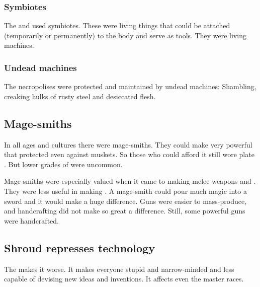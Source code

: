 \subsubsection{Symbiotes}
The \dragons and \ophidians used symbiotes. 
These were living things that could be attached (temporarily or permanently) to the body and serve as tools. 
They were living machines. 





\subsubsection{Undead machines}
The \draconic{} necropolises were protected and maintained by undead machines: 
Shambling, creaking hulks of rusty steel and desiccated flesh. 










\subsection{Mage-smiths}
In all ages and cultures there were mage-smiths. 
They could make very powerful \armour that protected even against muskets.
So those who could afford it still wore plate \armour.
But lower grades of \armour were uncommon.

Mage-smiths were especially valued when it came to making melee weapons and \armour. 
They were less useful in making . 
A mage-smith could pour much magic into a sword and it would make a huge difference.
Guns were easier to mass-produce, and handcrafting did not make so great a difference.
Still, some powerful guns were handcrafted.










\subsection{Shroud represses technology}
The  makes it worse. 
It makes everyone stupid and narrow-minded and less capable of devising new ideas and inventions.
It affects even the master races. 

